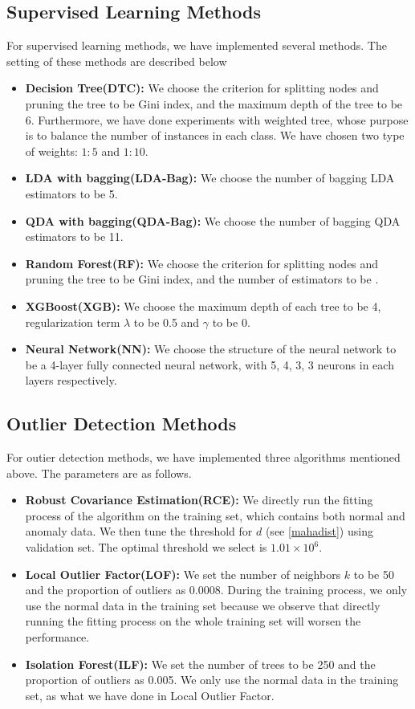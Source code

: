 \documentclass[english]{article}
\begin{document}
\subsection{Supervised Learning Methods}
\par For supervised learning methods, we have implemented several methods. The setting of these methods are described below
\begin{itemize}
	\item\textbf{Decision Tree(DTC): } We choose the criterion for splitting nodes and pruning the tree to be Gini index, and the maximum depth of the tree to be 6. Furthermore, we have done experiments with weighted tree, whose purpose is to balance the number of instances in each class. We have chosen two type of weights: $1:5$ and $1:10$.
	\item\textbf{LDA with bagging(LDA-Bag): }We choose the number of bagging LDA estimators to be 5.
	\item\textbf{QDA with bagging(QDA-Bag): }We choose the number of bagging QDA estimators to be 11.
	\item\textbf{Random Forest(RF): } We choose the criterion for splitting nodes and pruning the tree to be Gini index, and the number of estimators to be .
	\item\textbf{XGBoost(XGB): }We choose the maximum depth of each tree to be 4, regularization term $\lambda$ to be 0.5 and $\gamma$ to be 0.
	\item\textbf{Neural Network(NN): }We choose the structure of the neural network to be a 4-layer fully connected neural network, with 5, 4, 3, 3 neurons in each layers respectively.
\end{itemize}

\subsection{Outlier Detection Methods}
\par For outier detection methods, we have implemented three algorithms mentioned above. The parameters are as follows.
\begin{itemize}
\item \textbf{Robust Covariance Estimation(RCE): } We directly run the fitting process of the algorithm on the training set, which contains both normal and anomaly data. We then tune the threshold for $d$ (see \ref{mahadist}) using validation set. The optimal threshold we select is $1.01 \times 10^6$. 
\item \textbf{Local Outlier Factor(LOF): } We set the number of neighbors $k$ to be 50 and the proportion of outliers as 0.0008. During the training process, we only use the normal data in the training set because we observe that directly running the fitting process on the whole training set will worsen the performance.
\item \textbf{Isolation Forest(ILF): } We set the number of trees to be 250 and the proportion of outliers as 0.005. We only use the normal data in the training set, as what we have done in Local Outlier Factor. 
\end{itemize}
\end{document}
